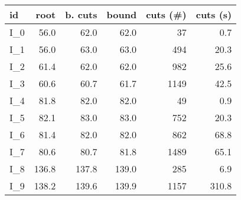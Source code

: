 \begin{tabular}{lrrrrr}
\toprule
   id &  root &  b. cuts &  bound &  cuts (\#) &  cuts (s) \\
\midrule
 I\_0 &  56.0 &     62.0 &   62.0 &         37 &       0.7 \\
 I\_1 &  56.0 &     63.0 &   63.0 &        494 &      20.3 \\
 I\_2 &  61.4 &     62.0 &   62.0 &        982 &      25.6 \\
 I\_3 &  60.6 &     60.7 &   61.7 &       1149 &      42.5 \\
 I\_4 &  81.8 &     82.0 &   82.0 &         49 &       0.9 \\
 I\_5 &  82.1 &     83.0 &   83.0 &        752 &      20.3 \\
 I\_6 &  81.4 &     82.0 &   82.0 &        862 &      68.8 \\
 I\_7 &  80.6 &     80.7 &   81.8 &       1489 &      65.1 \\
 I\_8 & 136.8 &    137.8 &  139.0 &        285 &       6.9 \\
 I\_9 & 138.2 &    139.6 &  139.9 &       1157 &     310.8 \\
\bottomrule
\end{tabular}
